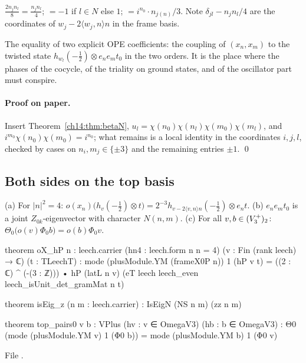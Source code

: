 \begin{dictionary}
$\tfrac{2n_jn_l}{8}=\tfrac{n_jn_l}4$;  $=-1$ if $l\in N$ else $1$; 
$=i^{n_0}\cdot n_{j(n)}/3$.  Note $\delta_{jl}-n_jn_l/4$ are the coordinates of $w_j-2\langle w_j,n\rangle n$ in the frame basis.
\end{dictionary}

\begin{physics}
The equality of two explicit OPE coefficients: the coupling of $(x_n,x_m)$ to the twisted state
$h_{w_l}(-\tfrac12)\otimes e_ne_mt_0$ in the two orders.  It is the place where the phases of the cocycle,
of the triality on ground states, and of the oscillator part must conspire.
\end{physics}

\paragraph{Proof on paper.}  Insert Theorem~\ref{ch14:thm:betaN}, $u_l=\chi(n_0)\chi(n_l)\chi(m_0)\chi(m_l)$, and
$i^{m_0}\chi(n_0)\chi(m_0)=i^{n_0}$; what remains is a local identity in the coordinates $i,j,l$, checked by
cases on $n_i,m_j\in\{\pm3\}$ and the remaining entries $\pm1$. \qed

\subsection{Both sides on the top basis}

\begin{theorem}\label{ch14:thm:toppairs0}
(a) For $|n|^2=4$: $o(x_n)\bigl(h_v(-\tfrac12)\otimes t\bigr)=2^{-3}h_{v-2\langle v,n\rangle n}(-\tfrac12)\otimes e_nt$.
(b) $e_ne_mt_0$ is a joint $Z_{0k}$-eigenvector with character $N(n,m)$.
(c) For all $v,b\in(V_3^{+})_2$: $\Theta_0\bigl(o(v)\Phi_0b\bigr)=o(b)\Phi_0v$.
\end{theorem}
\begin{leancode}
theorem oX_hP {n : leech.carrier} (hn4 : leech.form n n = 4) (v : Fin (rank leech) → ℂ)
    (t : TLeechT) :
    mode (plusModule.YM (frameX0P n)) 1 (hP v t)
      = ((2 : ℂ) ^ (-(3 : ℤ))) • hP (latL n v) (eT leech leech_even leech_isUnit_det_gramMat n t)

theorem isEig_z (n m : leech.carrier) : IsEigN (NS n m) (zz n m)

theorem top_pairs0 {v b : VPlus} (hv : v ∈ OmegaV3) (hb : b ∈ OmegaV3) :
    Θ0 (mode (plusModule.YM v) 1 (Φ0 b)) = mode (plusModule.YM b) 1 (Φ0 v)
\end{leancode}
File .

